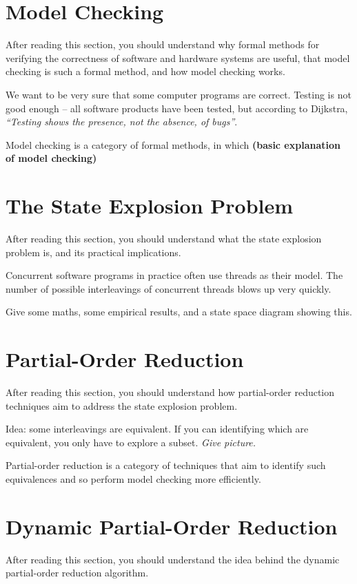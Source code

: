 \documentclass[12pt,a4paper,twoside,openright]{report}
\begin{document}
\section{Model Checking}
After reading this section,
you should understand why formal methods for
verifying the correctness of software and
hardware systems are useful, that model
checking is such a formal method, and
how model checking works.

We want to be very sure that some computer
programs are correct. Testing is not good
enough -- all software products have been
tested, but according to Dijkstra,
\emph{``Testing shows the presence,
	not the absence, of bugs''}.

Model checking is a category of formal
methods, in which \textbf{(basic explanation of
model checking)}

\section{The State Explosion Problem}
After reading this section, you should
understand what the state explosion problem
is, and its practical implications.

Concurrent software programs in practice often
use threads as their model. The number of possible
interleavings of concurrent threads blows up very 
quickly.

Give some maths, some empirical results,
and a state space diagram showing this.

\section{Partial-Order Reduction}
After reading this section, you should
understand how partial-order reduction
techniques aim to address the state
explosion problem.

Idea: some interleavings are equivalent. If you
can identifying which are equivalent, you only
have to explore a subset. \emph{Give picture.}

Partial-order reduction is a category of techniques
that aim to identify such equivalences and so
perform model checking more efficiently.

\section{Dynamic Partial-Order Reduction}
After reading this section, you should
understand the idea behind the dynamic
partial-order reduction algorithm.
\end{document}
